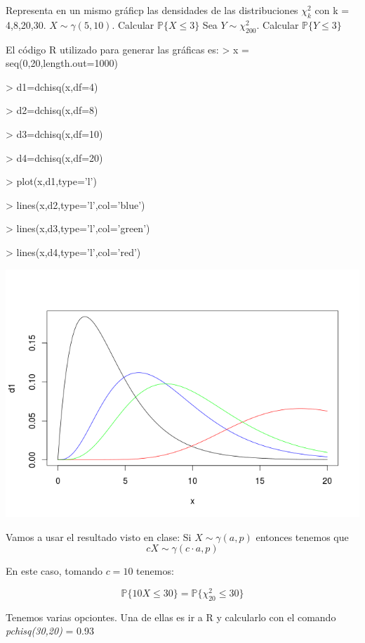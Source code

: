 \begin{problem}[3]
\ppart Representa en un mismo gráficp las densidades de las distribuciones $\chi^2_k $ con k = 4,8,20,30.
\ppart $X \sim \gamma(5,10)$. Calcular $\mathbb{P}\{X\leq 3\}$
\ppart Sea $Y \sim \chi_{200}^2$. Calcular $\mathbb{P}\{Y\leq 3\}$

\solution
\spart
El código R utilizado para generar las gráficas es:
> x = seq(0,20,length.out=1000)

> d1=dchisq(x,df=4)

> d2=dchisq(x,df=8)

> d3=dchisq(x,df=10)

> d4=dchisq(x,df=20)

> plot(x,d1,type='l')

> lines(x,d2,type='l',col='blue')

> lines(x,d3,type='l',col='green')

> lines(x,d4,type='l',col='red')


\begin{center}
\includegraphics[width=1\textwidth]{Chicuadrado.png}
\label{Ejercicio 4}
\end{center}

\spart
Vamos a usar el resultado visto en clase:
Si $X\sim \gamma(a,p)$ entonces tenemos que 
\[cX \sim \gamma(c\cdot a, p)\]

En este caso, tomando $c=10$ tenemos:

\[\mathbb{P}\{10X\leq 30\} = \mathbb{P}\{\chi^2_{20 }\leq 30\}  \]

Tenemos varias opciontes. Una de ellas es ir a R y calcularlo con el comando \emph{pchisq(30,20)} = 0.93


\end{problem}
